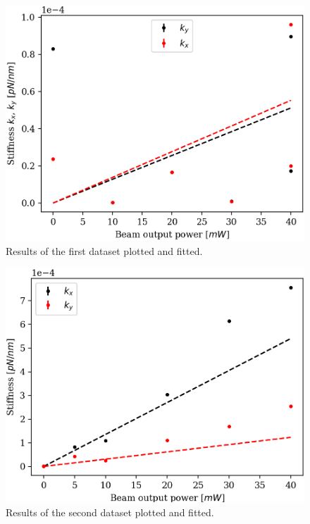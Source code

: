 \vspace{-.5cm}
\begin{minipage}{\linewidth}
    \centering
    \begin{minipage}[l]{0.45\linewidth}
        \begin{figure}[H]
            \centering
            \includegraphics[width=\linewidth]{figures/beam.png}
            \caption{Results of the first dataset plotted and fitted.\\}
            \label{fig:bead-plot}
        \end{figure}
    \end{minipage}
    \hspace{0.05\linewidth}
    \begin{minipage}[r]{0.45\linewidth}
        \begin{figure}[H]
            \centering
            \includegraphics[width=\linewidth]{figures/trap.png}
            \caption{Results of the second dataset plotted and fitted.\\}
            \label{fig:trap-plot}
        \end{figure}
    \end{minipage}

\end{minipage}
